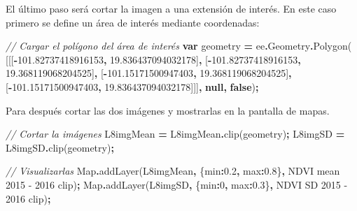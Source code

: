 \documentclass[
  12pt,
  letterpaper,
  twoside]{book}
\newenvironment{Shaded}{\begin{snugshade}}{\end{snugshade}}
\newcommand{\AttributeTok}[1]{\textcolor[rgb]{0.77,0.63,0.00}{#1}}
\newcommand{\BuiltInTok}[1]{#1}
\newcommand{\CommentTok}[1]{\textcolor[rgb]{0.56,0.35,0.01}{\textit{#1}}}
\newcommand{\DataTypeTok}[1]{\textcolor[rgb]{0.13,0.29,0.53}{#1}}
\newcommand{\DecValTok}[1]{\textcolor[rgb]{0.00,0.00,0.81}{#1}}
\newcommand{\FloatTok}[1]{\textcolor[rgb]{0.00,0.00,0.81}{#1}}
\newcommand{\FunctionTok}[1]{\textcolor[rgb]{0.00,0.00,0.00}{#1}}
\newcommand{\KeywordTok}[1]{\textcolor[rgb]{0.13,0.29,0.53}{\textbf{#1}}}
\newcommand{\NormalTok}[1]{#1}
\newcommand{\OperatorTok}[1]{\textcolor[rgb]{0.81,0.36,0.00}{\textbf{#1}}}
\newcommand{\StringTok}[1]{\textcolor[rgb]{0.31,0.60,0.02}{#1}}
\begin{document}
El último paso será cortar la imagen a una extensión de interés. En este caso primero se define un área de interés mediante coordenadas:

\begin{Shaded}
\begin{Highlighting}[]
\CommentTok{// Cargar el polígono del área de interés}
\KeywordTok{var}\NormalTok{ geometry }\OperatorTok{=}\NormalTok{ ee}\OperatorTok{.}\AttributeTok{Geometry}\OperatorTok{.}\FunctionTok{Polygon}\NormalTok{(}
\NormalTok{        [[[}\OperatorTok{{-}}\FloatTok{101.82737418916153}\OperatorTok{,} \FloatTok{19.836437094032178}\NormalTok{]}\OperatorTok{,}
\NormalTok{          [}\OperatorTok{{-}}\FloatTok{101.82737418916153}\OperatorTok{,} \FloatTok{19.368119068204525}\NormalTok{]}\OperatorTok{,}
\NormalTok{          [}\OperatorTok{{-}}\FloatTok{101.15171500947403}\OperatorTok{,} \FloatTok{19.368119068204525}\NormalTok{]}\OperatorTok{,}
\NormalTok{          [}\OperatorTok{{-}}\FloatTok{101.15171500947403}\OperatorTok{,} \FloatTok{19.836437094032178}\NormalTok{]]]}\OperatorTok{,} \KeywordTok{null}\OperatorTok{,} \KeywordTok{false}\NormalTok{)}\OperatorTok{;}
\end{Highlighting}
\end{Shaded}

Para después cortar las dos imágenes y mostrarlas en la pantalla de mapas.

\begin{Shaded}
\begin{Highlighting}[]
\CommentTok{// Cortar la imágenes}
\NormalTok{L8imgMean }\OperatorTok{=}\NormalTok{ L8imgMean}\OperatorTok{.}\FunctionTok{clip}\NormalTok{(geometry)}\OperatorTok{;}
\NormalTok{L8imgSD }\OperatorTok{=}\NormalTok{ L8imgSD}\OperatorTok{.}\FunctionTok{clip}\NormalTok{(geometry)}\OperatorTok{;}

\CommentTok{// Visualizarlas}
\BuiltInTok{Map}\OperatorTok{.}\FunctionTok{addLayer}\NormalTok{(L8imgMean}\OperatorTok{,}\NormalTok{ \{}\DataTypeTok{min}\OperatorTok{:}\FloatTok{0.2}\OperatorTok{,} \DataTypeTok{max}\OperatorTok{:}\FloatTok{0.8}\NormalTok{\}}\OperatorTok{,} \StringTok{\textquotesingle{}NDVI mean 2015 {-} 2016 clip\textquotesingle{}}\NormalTok{)}\OperatorTok{;}
\BuiltInTok{Map}\OperatorTok{.}\FunctionTok{addLayer}\NormalTok{(L8imgSD}\OperatorTok{,}\NormalTok{ \{}\DataTypeTok{min}\OperatorTok{:}\DecValTok{0}\OperatorTok{,} \DataTypeTok{max}\OperatorTok{:}\FloatTok{0.3}\NormalTok{\}}\OperatorTok{,} \StringTok{\textquotesingle{}NDVI SD 2015 {-} 2016 clip\textquotesingle{}}\NormalTok{)}\OperatorTok{;}
\end{Highlighting}
\end{Shaded}
\end{document}
